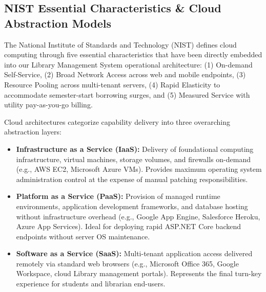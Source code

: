 \documentclass[10pt,journal,compsoc]{IEEEtran}
\begin{document}
\subsection{NIST Essential Characteristics \& Cloud Abstraction Models}
The National Institute of Standards and Technology (NIST) defines cloud computing through five essential characteristics that have been directly embedded into our Library Management System operational architecture: (1) On-demand Self-Service, (2) Broad Network Access across web and mobile endpoints, (3) Resource Pooling across multi-tenant servers, (4) Rapid Elasticity to accommodate semester-start borrowing surges, and (5) Measured Service with utility pay-as-you-go billing.

Cloud architectures categorize capability delivery into three overarching abstraction layers:
\begin{itemize}[leftmargin=1.5em]
    \item \textbf{Infrastructure as a Service (IaaS):} Delivery of foundational computing infrastructure, virtual machines, storage volumes, and firewalls on-demand (e.g., AWS EC2, Microsoft Azure VMs). Provides maximum operating system administration control at the expense of manual patching responsibilities.
    \item \textbf{Platform as a Service (PaaS):} Provision of managed runtime environments, application development frameworks, and database hosting without infrastructure overhead (e.g., Google App Engine, Salesforce Heroku, Azure App Services). Ideal for deploying rapid ASP.NET Core backend endpoints without server OS maintenance.
    \item \textbf{Software as a Service (SaaS):} Multi-tenant application access delivered remotely via standard web browsers (e.g., Microsoft Office 365, Google Workspace, cloud Library management portals). Represents the final turn-key experience for students and librarian end-users.
\end{itemize}
\end{document}
